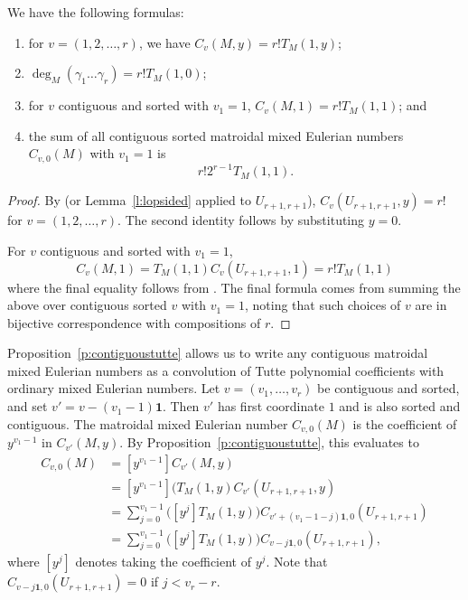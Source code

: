 \documentclass[ALCO,published]{cedram}
\numberwithin{equation}{section}
\numberwithin{figure}{section}
\begin{document}
\begin{coro} \label{c:tutte}
  We have the following formulas:
\begin{enumerate}
    \item \cite[Corollary~1.6]{BST} for $v=(1,2,\dots,r)$, we have $C_{v}(M,y)=r!T_M(1,y)$;
    \item $\deg_M(\gamma_1\dots\gamma_r)=r!T_M(1,0)$;
    \item for $v$ contiguous and sorted with $v_1=1$, $C_{v}(M,1)=r!T_M(1,1)$; and
    \item the sum of all contiguous sorted matroidal mixed Eulerian numbers $C_{v,0}(M)$ with $v_1=1$ is \[r!2^{r-1}T_M(1,1).\] 
\end{enumerate}
 
\end{coro}

\begin{proof}
  By \cite[Theorem~16.3]{Postnikov:permutohedra} (or Lemma~\ref{l:lopsided} applied to $U_{r+1,r+1}$), $C_{v}(U_{r+1,r+1},y)=r!$ for $v = (1,2,\ldots,r)$. The second identity follows by substituting $y=0$.

  For $v$ contiguous and sorted with $v_1=1$, 
  \[C_{v}(M,1)=T_M(1,1)C_{v}(U_{r+1,r+1},1)=r!T_M(1,1)\] 
  where the final equality follows from  \cite[Theorem~16.4]{Postnikov:permutohedra}.
  The final formula comes from summing the above over contiguous sorted $v$ with $v_1=1$, noting that such choices of $v$ are in bijective correspondence with compositions of $r$.
\end{proof}


Proposition~\ref{p:contiguoustutte} allows us to write any contiguous matroidal mixed Eulerian numbers as a convolution of Tutte polynomial coefficients with ordinary mixed Eulerian numbers. Let $v = (v_1,\ldots,v_r)$ be contiguous and sorted, and set $v' = v - (v_1-1)\mathbf{1}$. Then $v'$ has first coordinate $1$ and is also sorted and contiguous. The matroidal mixed Eulerian number $C_{v,0}(M)$ is the coefficient of $y^{v_1-1}$ in $C_{v'}(M,y)$. By Proposition~\ref{p:contiguoustutte}, this evaluates to
  \begin{align*}
  	C_{v,0}(M)
        & = [y^{v_1-1}]C_{v'}(M,y)\\
        & = [y^{v_1-1}](T_M(1,y)C_{v'}(U_{r+1,r+1},y)\\
 &= \sum_{j=0}^{v_1-1} \big( [y^j]T_M(1,y) \big) C_{v' + (v_1-1-j)\mathbf{1},0}(U_{r+1,r+1}) \\
	&= \sum_{j=0}^{v_1-1} \big( [y^j]T_M(1,y) \big) C_{v - j\mathbf{1},0}(U_{r+1,r+1}),
  \end{align*}
where $[y^j]$ denotes taking the coefficient of $y^j$. Note that $C_{v - j\mathbf{1},0}(U_{r+1,r+1}) = 0$ if $j < v_r - r$.
\end{document}
